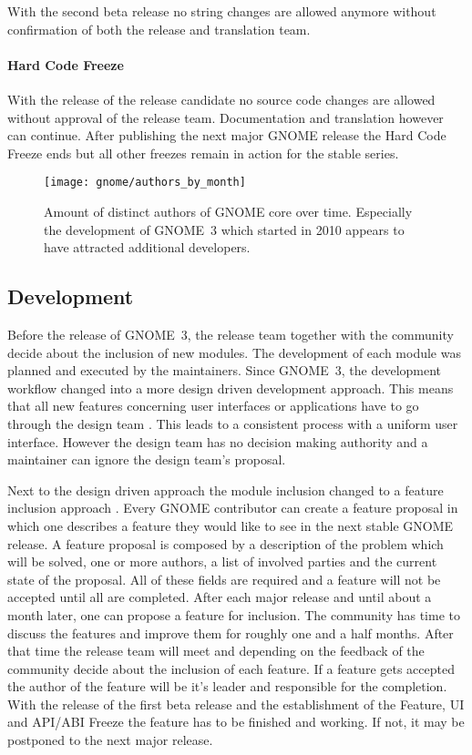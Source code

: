 With the second beta release no string changes are allowed anymore without
confirmation of both the release and translation team.

\paragraph{Hard Code Freeze}

With the release of the release candidate no source code changes are allowed
without approval of the release team. Documentation and translation however can
continue. After publishing the next major GNOME release the Hard Code Freeze
ends but all other freezes remain in action for the stable series.

\begin{figure}[htbp]
  \centering
  \texttt{[image: gnome/authors\_by\_month]}
  \caption{Amount of distinct authors of GNOME core over time. Especially the
  development of GNOME~3 which started in 2010 appears to have attracted
  additional developers.}
\end{figure}


\subsection{Development} %

Before the release of GNOME~3, the release team together with the community
decide about the inclusion of new modules. The development of each module was
planned and executed by the maintainers. Since GNOME~3, the development
workflow changed into a more design driven development approach. This means
that all new features concerning user interfaces or applications have to go
through the design team \cite{GNOMEDesignTeam}. This leads to a consistent
process with a uniform user interface. However the design team has no decision
making authority and a maintainer can ignore the design team's proposal.

Next to the design driven approach the module inclusion changed to a feature
inclusion approach \cite{GNOMEFeatures3.4,GNOMERoadMap}. Every GNOME
contributor can create a feature proposal in which one describes a feature they
would like to see in the next stable GNOME release. A feature proposal is
composed by a description of the problem which will be solved, one or more
authors, a list of involved parties and the current state of the proposal. All
of these fields are required and a feature will not be accepted until all are
completed. After each major release and until about a month later, one can
propose a feature for inclusion. The community has time to discuss the features
and improve them for roughly one and a half months. After that time the release
team will meet and depending on the feedback of the community decide about the
inclusion of each feature. If a feature gets accepted the author of the feature
will be it's leader and responsible for the completion. With the release of the
first beta release and the establishment of the Feature, \ac{UI} and
\ac{API}/\ac{ABI} Freeze the feature has to be finished and working. If not, it
may be postponed to the next major release.


